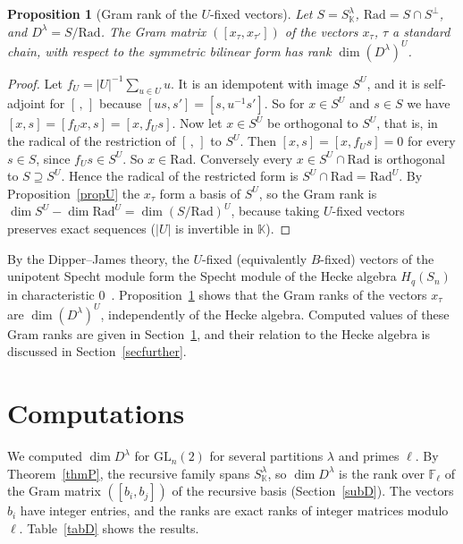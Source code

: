 \documentclass[11pt, letterpaper]{amsart}
\newtheorem{proposition}{Proposition}
\theoremstyle{definition}
\theoremstyle{remark}
\newcommand{\FF}{\mathbb{F}}
\newcommand{\KK}{\mathbb{K}}
\newcommand{\GL}{\mathrm{GL}}
\begin{document}
\begin{proposition}[Gram rank of the $U$-fixed vectors]\label{propGramU}
Let $S=S^\lambda_\KK$, $\mathrm{Rad}=S\cap S^\perp$, and $D^\lambda=S/\mathrm{Rad}$. The Gram matrix $([x_\tau,x_{\tau'}])$ of the vectors $x_\tau$, $\tau$ a standard chain, with respect to the symmetric bilinear form has rank $\dim(D^\lambda)^U$.
\end{proposition}
\begin{proof}
Let $f_U=|U|^{-1}\sum_{u\in U}u$. It is an idempotent with image $S^U$, and it is self-adjoint for $[\,,\,]$ because $[us,s']=[s,u^{-1}s']$. So for $x\in S^U$ and $s\in S$ we have $[x,s]=[f_Ux,s]=[x,f_Us]$. Now let $x\in S^U$ be orthogonal to $S^U$, that is, in the radical of the restriction of $[\,,\,]$ to $S^U$. Then $[x,s]=[x,f_Us]=0$ for every $s\in S$, since $f_Us\in S^U$. So $x\in\mathrm{Rad}$. Conversely every $x\in S^U\cap\mathrm{Rad}$ is orthogonal to $S\supseteq S^U$. Hence the radical of the restricted form is $S^U\cap\mathrm{Rad}=\mathrm{Rad}^U$. By Proposition~\ref{propU} the $x_\tau$ form a basis of $S^U$, so the Gram rank is $\dim S^U-\dim\mathrm{Rad}^U=\dim(S/\mathrm{Rad})^U$, because taking $U$-fixed vectors preserves exact sequences ($|U|$ is invertible in $\KK$).
\end{proof}

By the Dipper--James theory, the $U$-fixed (equivalently $B$-fixed) vectors of the unipotent Specht module form the Specht module of the Hecke algebra $H_q(S_n)$ in characteristic $0$~\cite[(3.1)(vi), (2.15)(i), Example~5.2]{DJ89}. Proposition~\ref{propGramU} shows that the Gram ranks of the vectors $x_\tau$ are $\dim(D^\lambda)^U$, independently of the Hecke algebra. Computed values of these Gram ranks are given in Section~\ref{seccomp}, and their relation to the Hecke algebra is discussed in Section~\ref{secfurther}.

\section{Computations}\label{seccomp}

We computed $\dim D^\lambda$ for $\GL_n(2)$ for several partitions $\lambda$ and primes $\ell$. By Theorem~\ref{thmP}, the recursive family spans $S^\lambda_\KK$, so $\dim D^\lambda$ is the rank over $\FF_\ell$ of the Gram matrix $([b_i,b_j])$ of the recursive basis (Section~\ref{subD}). The vectors $b_i$ have integer entries, and the ranks are exact ranks of integer matrices modulo $\ell$. Table~\ref{tabD} shows the results.
\end{document}
